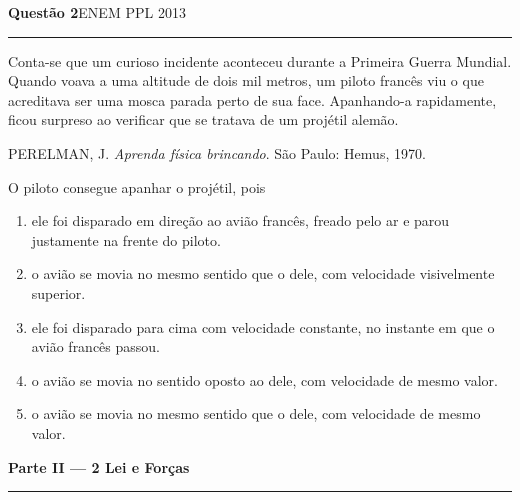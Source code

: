 \documentclass[11pt,a4paper]{article}
\newcommand{\fonte}[1]{{\small\scshape\color{grafite}#1}}
\newenvironment{questao}[2]{%
  \needspace{6\baselineskip}
  \par\addvspace{1.6em}
  {\large\bfseries\color{vinho}Quest\~ao #1}\hfill #2\\[-0.55em]
  {\color{black!25}\rule{\linewidth}{0.4pt}}
  \par\nobreak\smallskip
}{\par\addvspace{0.4em}}
\newcommand{\parte}[1]{%
  \needspace{7\baselineskip}
  \vspace{1.8em}
  {\Large\bfseries #1}\\[-0.55em]
  {\color{black!30}\rule{\linewidth}{0.5pt}}
  \par\nobreak\smallskip
}
\begin{document}
\begin{questao}{2}{\fonte{ENEM PPL 2013}}
Conta-se que um curioso incidente aconteceu durante a Primeira Guerra
Mundial. Quando voava a uma altitude de dois mil metros, um piloto
franc\^es viu o que acreditava ser uma mosca parada perto de sua face.
Apanhando-a rapidamente, ficou surpreso ao verificar que se tratava de
um proj\'etil alem\~ao.
\begin{flushright}\small
PERELMAN, J. \textit{Aprenda f\'isica brincando}. S\~ao Paulo: Hemus, 1970.
\end{flushright}

O piloto consegue apanhar o proj\'etil, pois
\begin{enumerate}
  \item ele foi disparado em dire\c{c}\~ao ao avi\~ao franc\^es, freado
        pelo ar e parou justamente na frente do piloto.
  \item o avi\~ao se movia no mesmo sentido que o dele, com velocidade
        visivelmente superior.
  \item ele foi disparado para cima com velocidade constante, no
        instante em que o avi\~ao franc\^es passou.
  \item o avi\~ao se movia no sentido oposto ao dele, com velocidade de
        mesmo valor.
  \item o avi\~ao se movia no mesmo sentido que o dele, com velocidade
        de mesmo valor.
\end{enumerate}
\end{questao}

\parte{Parte II --- 2\textordfeminine{} Lei e For\c{c}as}
\end{document}
